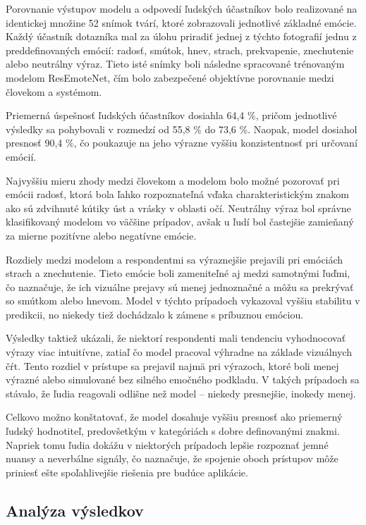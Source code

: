 Porovnanie výstupov modelu a odpovedí ľudských účastníkov bolo realizované na identickej množine 52 snímok tvárí, ktoré zobrazovali jednotlivé základné emócie. Každý účastník dotazníka mal za úlohu priradiť jednej z týchto fotografií jednu z preddefinovaných emócií: radosť, smútok, hnev, strach, prekvapenie, znechutenie alebo neutrálny výraz. Tieto isté snímky boli následne spracované trénovaným modelom ResEmoteNet, čím bolo zabezpečené objektívne porovnanie medzi človekom a systémom.

Priemerná úspešnosť ľudských účastníkov dosiahla 64,4 \%, pričom jednotlivé výsledky sa pohybovali v rozmedzí od 55,8 \% do 73,6 \%. Naopak, model dosiahol presnosť 90,4 \%, čo poukazuje na jeho výrazne vyššiu konzistentnosť pri určovaní emócií.

Najvyššiu mieru zhody medzi človekom a modelom bolo možné pozorovať pri emócii radosť, ktorá bola ľahko rozpoznateľná vďaka charakteristickým znakom ako sú zdvihnuté kútiky úst a vrásky v oblasti očí. Neutrálny výraz bol správne klasifikovaný modelom vo väčšine prípadov, avšak u ľudí bol častejšie zamieňaný za mierne pozitívne alebo negatívne emócie.

Rozdiely medzi modelom a respondentmi sa výraznejšie prejavili pri emóciách strach a znechutenie. Tieto emócie boli zameniteľné aj medzi samotnými ľuďmi, čo naznačuje, že ich vizuálne prejavy sú menej jednoznačné a môžu sa prekrývať so smútkom alebo hnevom. Model v týchto prípadoch vykazoval vyššiu stabilitu v predikcii, no niekedy tiež dochádzalo k zámene s príbuznou emóciou.

Výsledky taktiež ukázali, že niektorí respondenti mali tendenciu vyhodnocovať výrazy viac intuitívne, zatiaľ čo model pracoval výhradne na základe vizuálnych čŕt. Tento rozdiel v prístupe sa prejavil najmä pri výrazoch, ktoré boli menej výrazné alebo simulované bez silného emočného podkladu. V takých prípadoch sa stávalo, že ľudia reagovali odlišne než model – niekedy presnejšie, inokedy menej.

Celkovo možno konštatovať, že model dosahuje vyššiu presnosť ako priemerný ľudský hodnotiteľ, predovšetkým v kategóriách s dobre definovanými znakmi. Napriek tomu ľudia dokážu v niektorých prípadoch lepšie rozpoznať jemné nuansy a neverbálne signály, čo naznačuje, že spojenie oboch prístupov môže priniesť ešte spoľahlivejšie riešenia pre budúce aplikácie.

\subsection{Analýza výsledkov}

